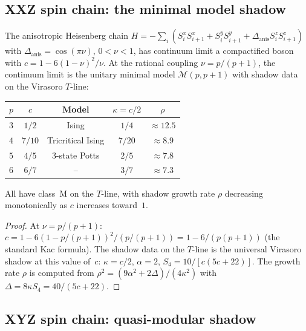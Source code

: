 \subsection{XXZ spin chain: the minimal model shadow}%
\label{subsec:xxz-shadow}

\begin{proposition}%
\label{prop:xxz-shadow-data}
The anisotropic Heisenberg chain
$H = -\sum_i(S_i^x S_{i+1}^x + S_i^y S_{i+1}^y
+ \Delta_{\mathrm{anis}} S_i^z S_{i+1}^z)$
with $\Delta_{\mathrm{anis}} = \cos(\pi\nu)$, $0 < \nu < 1$,
has continuum limit a compactified boson with
$c = 1 - 6(1-\nu)^2/\nu$. At the rational coupling
$\nu = p/(p+1)$, the continuum limit is the unitary minimal model
$\mathcal{M}(p, p+1)$ with shadow data on the Virasoro $T$-line:
\begin{center}
\renewcommand{\arraystretch}{1.3}
\begin{tabular}{ccccc}
\toprule
$p$ & $c$ & Model & $\kappa = c/2$ & $\rho$ \\
\midrule
$3$ & $1/2$ & Ising & $1/4$ & $\approx 12.5$ \\
$4$ & $7/10$ & Tricritical Ising & $7/20$ & $\approx 8.9$ \\
$5$ & $4/5$ & $3$-state Potts & $2/5$ & $\approx 7.8$ \\
$6$ & $6/7$ & -- & $3/7$ & $\approx 7.3$ \\
\bottomrule
\end{tabular}
\end{center}
All have class~M on the $T$-line, with shadow growth rate $\rho$
decreasing monotonically as $c$ increases toward~$1$.
\end{proposition}

\begin{proof}
At $\nu = p/(p+1)$: $c = 1 - 6(1-p/(p+1))^2/(p/(p+1))
= 1 - 6/(p(p+1))$ (the standard Kac formula).
The shadow data on the $T$-line is the universal Virasoro
shadow at this value of~$c$: $\kappa = c/2$, $\alpha = 2$,
$S_4 = 10/[c(5c+22)]$. The growth rate $\rho$ is computed
from $\rho^2 = (9\alpha^2 + 2\Delta)/(4\kappa^2)$ with
$\Delta = 8\kappa S_4 = 40/(5c+22)$.
\end{proof}

\subsection{XYZ spin chain: quasi-modular shadow}%
\label{subsec:xyz-shadow}

